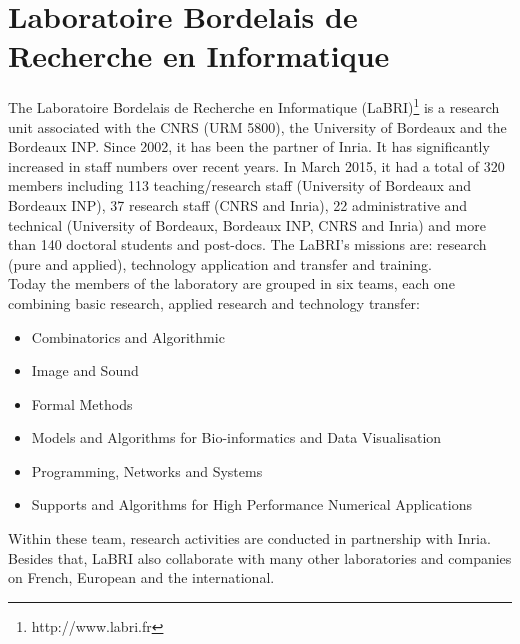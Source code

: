 \section{Laboratoire Bordelais de Recherche en Informatique}
The Laboratoire Bordelais de Recherche en Informatique (LaBRI)\footnote{http://www.labri.fr} is a research unit associated with the CNRS (URM 5800), the University of Bordeaux and the Bordeaux INP. Since 2002, it has been the partner of Inria. It has significantly increased in staff numbers over recent years. In March 2015, it had a total of 320 members including 113 teaching/research staff (University of Bordeaux and Bordeaux INP), 37 research staff (CNRS and Inria), 22 administrative and technical (University of Bordeaux, Bordeaux INP, CNRS and Inria) and more than 140 doctoral students and post-docs. The LaBRI's missions are: research (pure and applied), technology application and transfer and training.\\
Today the members of the laboratory are grouped in six teams, each one combining basic research, applied research and technology transfer:
\begin{itemize}
\item Combinatorics and Algorithmic
\item Image and Sound
\item Formal Methods
\item Models and Algorithms for Bio-informatics and Data Visualisation
\item Programming, Networks and Systems
\item Supports and Algorithms for High Performance Numerical Applications
\end{itemize} 
Within these team, research activities are conducted in partnership with Inria. Besides that, LaBRI also collaborate with many other laboratories and companies on French, European and the international.
\newpage
